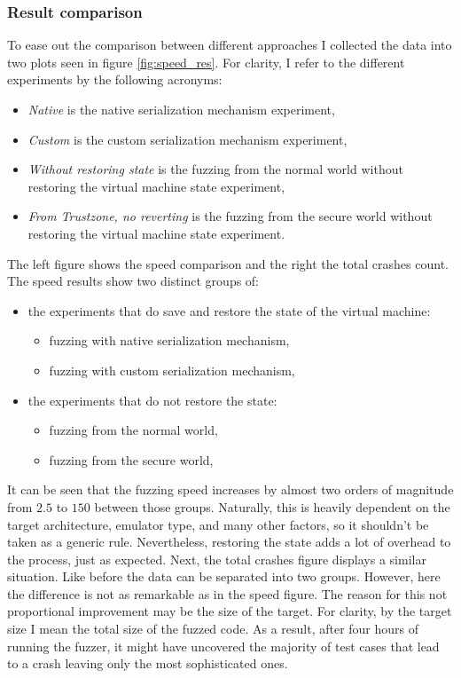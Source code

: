 \clearpage
\subsubsection{Result comparison}
To ease out the comparison between different approaches I collected the data into two plots seen in figure \ref{fig:speed_res}. 
For clarity, I refer to the different experiments by the following acronyms:
\begin{itemize}
    \item \textit{Native} is the native serialization mechanism experiment,
    \item \textit{Custom} is the custom serialization mechanism experiment,
    \item \textit{Without restoring state} is the fuzzing from the normal world without restoring the virtual machine state experiment,
    \item \textit{From Trustzone, no reverting} is the fuzzing from the secure world without restoring the virtual machine state experiment.
\end{itemize}
The left figure shows the speed comparison and the right the total crashes count. The speed results show two distinct groups of:
\begin{itemize}
    \item the experiments that do save and restore the state of the virtual machine:
    \begin{itemize}
        \item fuzzing with native serialization mechanism,
        \item fuzzing with custom serialization mechanism,
    \end{itemize}
    \item the experiments that do not restore the state:
    \begin{itemize}
        \item fuzzing from the normal world,
        \item fuzzing from the secure world,
    \end{itemize}
\end{itemize}
It can be seen that the fuzzing speed increases by almost two orders of magnitude from $2.5$ to $150$ between those groups. Naturally, this is heavily dependent on the target architecture, emulator type, and many other factors, so it shouldn't be taken as a generic rule. Nevertheless, restoring the state adds a lot of overhead to the process, just as expected. Next, the total crashes figure displays a similar situation. Like before the data can be separated into two groups. However, here the difference is not as remarkable as in the speed figure. The reason for this not proportional improvement may be the size of the target. For clarity, by the target size I mean the total size of the fuzzed code. As a result, after four hours of running the fuzzer, it might have uncovered the majority of test cases that lead to a crash leaving only the most sophisticated ones.

